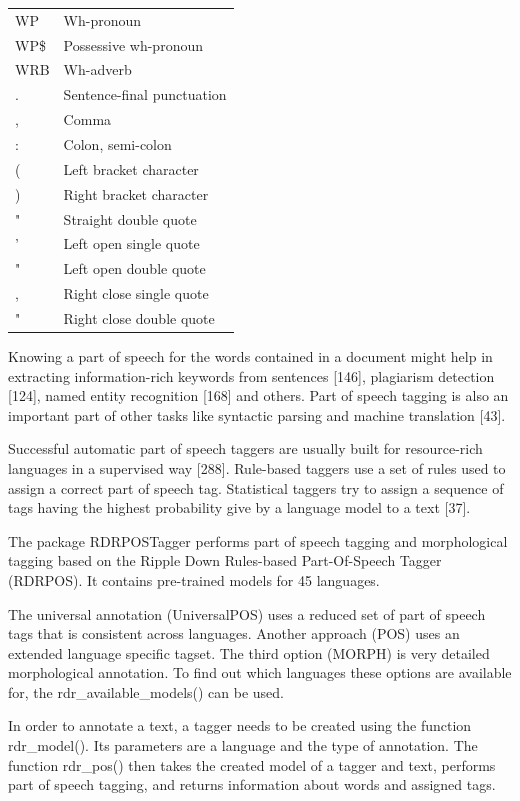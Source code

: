\documentclass[11pt,openany,executivepaper]{book}
\begin{document}
\begin{table}[htbp]
\begin{center}
\begin{tabular}{l|l}
WP & Wh-pronoun \\
WP\$ & Possessive wh-pronoun \\
WRB & Wh-adverb \\
. & Sentence-final punctuation \\
, & Comma \\
: & Colon, semi-colon \\
( & Left bracket character \\
) & Right bracket character \\
" & Straight double quote \\
' & Left open single quote \\
" & Left open double quote \\
, & Right close single quote \\
" & Right close double quote \\
\hline
\end{tabular}
\end{center}
\end{table}
\clearpage
Knowing a part of speech for the words contained in a document might help in extracting information-rich keywords from sentences [146], plagiarism detection [124], named entity recognition [168] and others. Part of speech tagging is also an important part of other tasks like syntactic parsing and machine translation [43].

Successful automatic part of speech taggers are usually built for resource-rich languages in a supervised way [288]. Rule-based taggers use a set of rules used to assign a correct part of speech tag. Statistical taggers try to assign a sequence of tags having the highest probability give by a language model to a text [37].

The package RDRPOSTagger performs part of speech tagging and morphological tagging based on the Ripple Down Rules-based Part-Of-Speech Tagger (RDRPOS). It contains pre-trained models for 45 languages.

The universal annotation (UniversalPOS) uses a reduced set of part of speech tags that is consistent across languages. Another approach (POS) uses an extended language specific tagset. The third option (MORPH) is very detailed morphological annotation. To find out which languages these options are available for, the rdr\_available\_models() can be used.

In order to annotate a text, a tagger needs to be created using the function rdr\_model(). Its parameters are a language and the type of annotation. The function rdr\_pos() then takes the created model of a tagger and text, performs part of speech tagging, and returns information about words and assigned tags.
\end{document}
